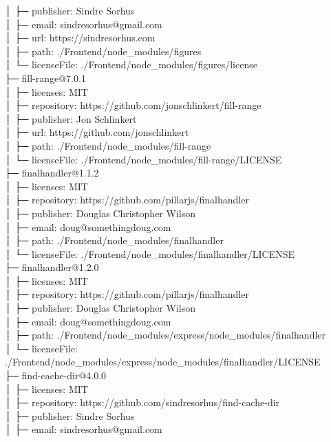 │  ├─ publisher: Sindre Sorhus\\
│  ├─ email: sindresorhus@gmail.com\\
│  ├─ url: https://sindresorhus.com\\
│  ├─ path: ./Frontend/node\_modules/figures\\
│  └─ licenseFile: ./Frontend/node\_modules/figures/license\\
├─ fill-range@7.0.1\\
│  ├─ licenses: MIT\\
│  ├─ repository: https://github.com/jonschlinkert/fill-range\\
│  ├─ publisher: Jon Schlinkert\\
│  ├─ url: https://github.com/jonschlinkert\\
│  ├─ path: ./Frontend/node\_modules/fill-range\\
│  └─ licenseFile: ./Frontend/node\_modules/fill-range/LICENSE\\
├─ finalhandler@1.1.2\\
│  ├─ licenses: MIT\\
│  ├─ repository: https://github.com/pillarjs/finalhandler\\
│  ├─ publisher: Douglas Christopher Wilson\\
│  ├─ email: doug@somethingdoug.com\\
│  ├─ path: ./Frontend/node\_modules/finalhandler\\
│  └─ licenseFile: ./Frontend/node\_modules/finalhandler/LICENSE\\
├─ finalhandler@1.2.0\\
│  ├─ licenses: MIT\\
│  ├─ repository: https://github.com/pillarjs/finalhandler\\
│  ├─ publisher: Douglas Christopher Wilson\\
│  ├─ email: doug@somethingdoug.com\\
│  ├─ path: ./Frontend/node\_modules/express/node\_modules/finalhandler\\
│  └─ licenseFile: ./Frontend/node\_modules/express/node\_modules/finalhandler/LICENSE\\
├─ find-cache-dir@4.0.0\\
│  ├─ licenses: MIT\\
│  ├─ repository: https://github.com/sindresorhus/find-cache-dir\\
│  ├─ publisher: Sindre Sorhus\\
│  ├─ email: sindresorhus@gmail.com\\
